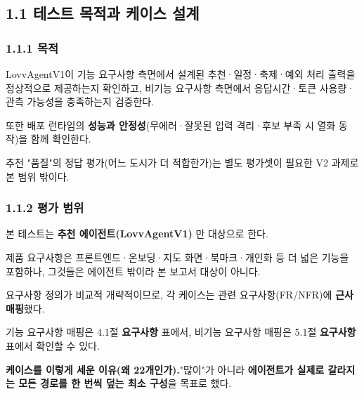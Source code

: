 \documentclass[12pt,a4paper]{article}
\newcommand{\DocNeedspace}[1]{\par\ifdim\dimexpr\pagegoal-\pagetotal\relax<#1\newpage\fi}
\begin{document}
\newpage
\DocNeedspace{18\baselineskip}
\subsection*{1.1 테스트 목적과 케이스 설계}

\subsubsection*{1.1.1 목적}

LovvAgentV1이 기능 요구사항 측면에서 설계된 추천·일정·축제·예외 처리 출력을 정상적으로 제공하는지 확인하고, 비기능 요구사항 측면에서 응답시간·토큰 사용량·관측 가능성을 충족하는지 검증한다.
\par\noindent 또한 배포 런타임의 \textbf{성능과 안정성}(무에러·잘못된 입력 격리·후보 부족 시 열화 동작)을 함께 확인한다.
\par\noindent 추천 "품질"의 정답 평가(어느 도시가 더 적합한가)는 별도 평가셋이 필요한 V2 과제로 본 범위 밖이다.

\subsubsection*{1.1.2 평가 범위}

본 테스트는 \textbf{추천 에이전트(LovvAgentV1)} 만 대상으로 한다.
\par\noindent 제품 요구사항은 프론트엔드·온보딩·지도 화면·북마크·개인화 등 더 넓은 기능을 포함하나, 그것들은 에이전트 밖이라 본 보고서 대상이 아니다.
\par\noindent 요구사항 정의가 비교적 개략적이므로, 각 케이스는 관련 요구사항(FR/NFR)에 \textbf{근사 매핑}했다.
\par\noindent 기능 요구사항 매핑은 4.1절 \textbf{요구사항} 표에서, 비기능 요구사항 매핑은 5.1절 \textbf{요구사항} 표에서 확인할 수 있다.

\textbf{케이스를 이렇게 세운 이유(왜 22개인가).}\quad "많이"가 아니라 \textbf{에이전트가 실제로 갈라지는 모든 경로를 한 번씩 덮는 최소 구성}을 목표로 했다.
\end{document}
